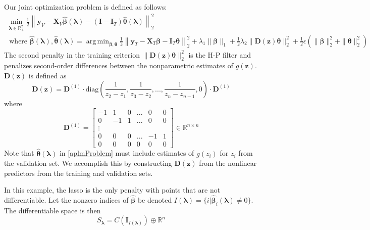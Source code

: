 \documentclass[10pt,letterpaper]{article}
\DeclareMathOperator*{\argmin}{arg\,min}
\begin{document}
Our joint optimization problem is defined as follows:
\begin{equation}
\begin{array}{c}
\min_{\boldsymbol\lambda \in \mathbb{R}^2_{+}} \frac{1}{2}
\left \|
\boldsymbol{y}_V
- \boldsymbol{X}_V\hat{\boldsymbol{\beta}}(\boldsymbol{\lambda})
- (\boldsymbol{I} - \boldsymbol{I}_T) \hat{\boldsymbol{\theta}}(\boldsymbol{\lambda})
\right \|^2_2 \\
\text{ where }
\hat{\boldsymbol{\beta}}(\boldsymbol{\lambda}),
\hat{\boldsymbol{\theta}}(\boldsymbol{\lambda}) =
\argmin_{\boldsymbol{\beta}, \boldsymbol{\theta}}
\frac{1}{2} \left \|
\boldsymbol{y}_T
- \boldsymbol{X}_T\boldsymbol{\beta}
- \boldsymbol{I}_T \boldsymbol{\theta} \right \|^2_2
+ \lambda_1 \| \boldsymbol{\beta} \|_1
+ \frac{1}{2} \lambda_2 \| \boldsymbol{D}(\boldsymbol{z}) \boldsymbol{\theta} \|_2^2
+ \frac{1}{2} \epsilon \left( \| \boldsymbol{\beta} \|_2^2 + \| \boldsymbol{\theta} \|_2^2 \right )
\end{array}
\label{aplmProblem}
\end{equation}
The second penalty in the training criterion $\| \boldsymbol{D}(\boldsymbol{z}) \boldsymbol{\theta} \|_2^2$ is the H-P filter and penalizes second-order differences between the nonparametric estimates of $g(\boldsymbol{z})$. $\boldsymbol{D}(\boldsymbol{z})$ is defined as
\begin{equation}
\boldsymbol{D}(\boldsymbol{z}) = \boldsymbol{D}^{(1)} \cdot
\text{diag} \left ( \frac{1}{z_{2} - z_1}, \frac{1}{z_{3} - z_2}, ... , \frac{1}{z_{n} - z_{n-1}}, 0 \right )
\cdot \boldsymbol{D}^{(1)}
\end{equation}
where
\begin{equation}
\boldsymbol{D}^{(1)} = 
\begin{bmatrix}
-1 & 1 & 0 & ... & 0 & 0 \\
0 & -1 & 1 & ... & 0 & 0 \\
\vdots \\
0 & 0 & 0 & ... & -1 & 1 \\
0 &0 & 0 &  0  &  0 & 0
\end{bmatrix}
\in
\mathbb{R}^{n\times n}
\end{equation}
Note that $\hat{\boldsymbol{\theta}}(\boldsymbol{\lambda})$ in \eqref{aplmProblem} must include estimates of $g(z_i)$ for  $z_i$ from the validation set. We accomplish this by constructing $\boldsymbol{D}(\boldsymbol{z})$ from the nonlinear predictors from the training and validation sets.

In this example, the lasso is the only penalty with points that are not differentiable. Let the nonzero indices of $\hat{\boldsymbol{\beta}}$ be denoted $I(\boldsymbol\lambda) = \{i | \hat{\boldsymbol{\beta}}_i(\boldsymbol\lambda) \ne 0\}$. The differentiable space is then
\begin{equation}
S_{\boldsymbol{\lambda}} = C(\boldsymbol I_{I(\boldsymbol\lambda)}) \oplus \mathbb{R}^n
\end{equation}
\end{document}
